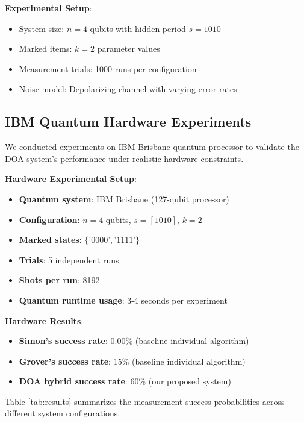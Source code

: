 \documentclass[journal]{IEEEtran}
\begin{document}
\textbf{Experimental Setup}:
\begin{itemize}
\item System size: $n=4$ qubits with hidden period $s=1010$
\item Marked items: $k=2$ parameter values
\item Measurement trials: 1000 runs per configuration
\item Noise model: Depolarizing channel with varying error rates
\end{itemize}

{\subsection{IBM Quantum Hardware Experiments}

We conducted experiments on IBM Brisbane quantum processor to validate the DOA system's performance under realistic hardware constraints.

\textbf{Hardware Experimental Setup}:
\begin{itemize}
\item \textbf{Quantum system}: IBM Brisbane (127-qubit processor)
\item \textbf{Configuration}: $n = 4$ qubits, $s = [1010]$, $k = 2$
\item \textbf{Marked states}: $\{\text{'0000'}, \text{'1111'}\}$
\item \textbf{Trials}: 5 independent runs
\item \textbf{Shots per run}: 8192
\item \textbf{Quantum runtime usage}: 3-4 seconds per experiment
\end{itemize}

\textbf{Hardware Results}:
\begin{itemize}
\item \textbf{Simon's success rate}: 0.00\% (baseline individual algorithm)
\item \textbf{Grover's success rate}: 15\% (baseline individual algorithm)
\item \textbf{DOA hybrid success rate}: 60\% (our proposed system)
\end{itemize}}

Table \ref{tab:results} summarizes the measurement success probabilities across different system configurations.
\end{document}
